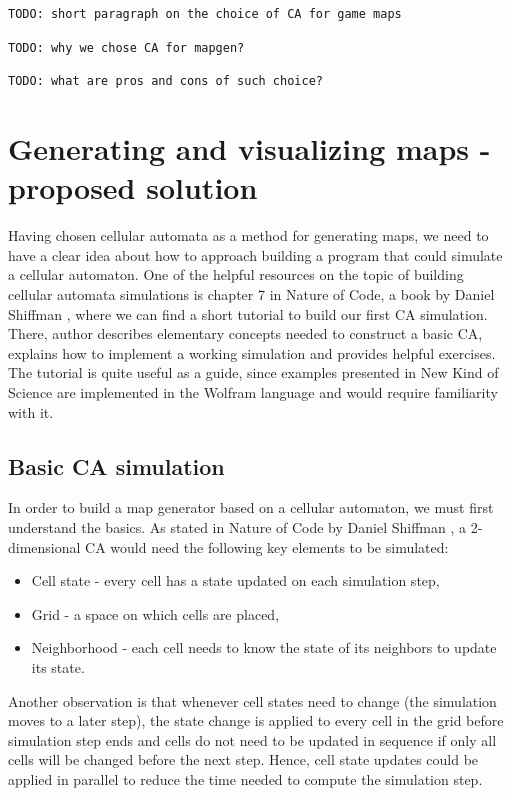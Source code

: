 \documentclass[12pt]{report}
\newcommand{\todo}[1]{}
\renewcommand{\todo}[1]{{\color{red} \par \noindent \footnotesize \texttt{TODO: {#1} }}}
\begin{document}
\todo{short paragraph on the choice of CA for game maps}
\todo{why we chose CA for mapgen?}
\todo{what are pros and cons of such choice?}

\chapter{Generating and visualizing maps - proposed solution} \label{rozdzial.praktyka} 

Having chosen cellular automata as a method for generating maps, we need to have a clear idea about how to approach building a program that could simulate a cellular automaton. One of the helpful resources on the topic of building cellular automata simulations is chapter 7 in Nature of Code, a book by Daniel Shiffman \autocite{shiffman2012nature}, where we can find a short tutorial to build our first CA simulation. There, author describes elementary concepts needed to construct a basic CA, explains how to implement a working simulation and provides helpful exercises. The tutorial is quite useful as a guide, since examples presented in New Kind of Science \autocite{wolfram2002new} are implemented in the Wolfram language and would require familiarity with it.

\section{Basic CA simulation}

In order to build a map generator based on a cellular automaton, we must first understand the basics. As stated in Nature of Code by Daniel Shiffman \autocite{shiffman2012nature}, a 2-dimensional CA would need the following key elements to be simulated:

\begin{itemize}
	\item Cell state - every cell has a state updated on each simulation step,
	\item Grid - a space on which cells are placed,
	\item Neighborhood - each cell needs to know the state of its neighbors to update its state.
\end{itemize}

Another observation is that whenever cell states need to change (the simulation moves to a later step), the state change is applied to every cell in the grid before simulation step ends and cells do not need to be updated in sequence if only all cells will be changed before the next step. Hence, cell state updates could be applied in parallel to reduce the time needed to compute the simulation step.
\end{document}
